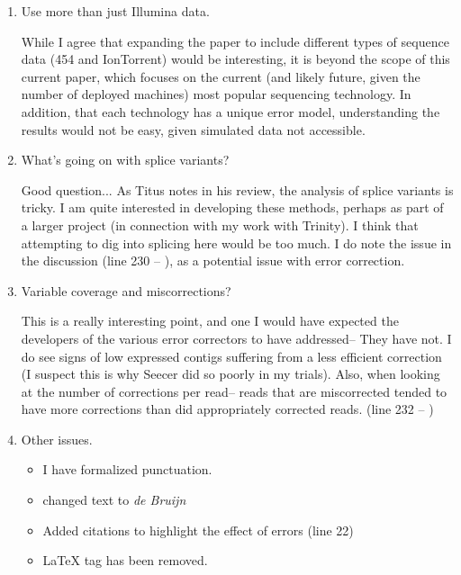 \documentclass[11pt]{article}
\begin{document}
\begin{enumerate}
\item Use more than just Illumina data. 
\begin{addmargin}[2em]{2em}
While I agree that expanding the paper to include different types of sequence data (454 and IonTorrent) would be interesting, it is beyond the scope of this current paper, which focuses on the current (and likely future, given the number of deployed machines) most popular sequencing technology. In addition, that each technology has a unique error model, understanding the results would not be easy, given simulated data not accessible. 
\end{addmargin}

\item What's going on with splice variants? 
\begin{addmargin}[2em]{2em}
Good question... As Titus notes in his review, the analysis of splice variants is tricky. I am quite interested in developing these methods, perhaps as part of a larger project (in connection with my work with Trinity). I think that attempting to dig into splicing here would be too much. I do note the issue in the discussion (line 230 -- ), as a potential issue with error correction. 
\end{addmargin}


\item Variable coverage and miscorrections? 
\begin{addmargin}[2em]{2em}
This is a really interesting point, and one I would have expected the developers of the various error correctors to have addressed-- They have not. I do see signs of low expressed contigs suffering from a less efficient correction (I suspect this is why Seecer did so poorly in my trials). Also, when looking at the number of corrections per read-- reads that are miscorrected tended to have more corrections than did appropriately corrected reads. (line 232 -- )
\end{addmargin}

 



\item Other issues. 
\begin{addmargin}[2em]{2em}
\begin{itemize}
\item I have formalized punctuation.
\item changed text to \textit{de Bruijn} 
\item Added citations to highlight the effect of errors (line 22)
\item LaTeX tag has been removed.




\end{itemize}
\end{addmargin}






\end{enumerate}
\end{document}
